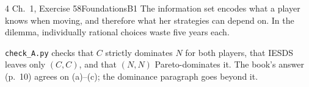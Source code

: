 \begin{exsol}{4}{\MG{} Ch.~1, Exercise 5}{8}{Foundations}{B1}
\interp The information set encodes what a player knows when moving, and therefore what her
strategies can depend on. In the dilemma, individually rational choices waste five years each.

\verify \texttt{check\_A.py} checks that $C$ strictly dominates $N$ for both players, that
IESDS leaves only $(C,C)$, and that $(N,N)$ Pareto-dominates it. The book's answer (p.~10)
agrees on (a)--(c); the dominance paragraph goes beyond it.

\end{exsol}
